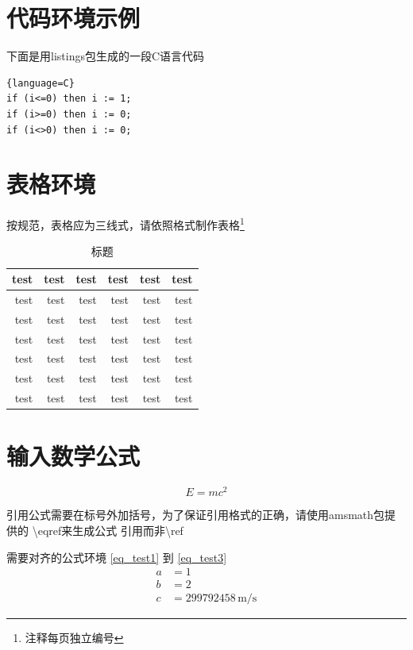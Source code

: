 \section{代码环境示例}

下面是用listings包生成的一段C语言代码
\begin{lstlisting}{language=C}
if (i<=0) then i := 1;
if (i>=0) then i := 0;
if (i<>0) then i := 0;
\end{lstlisting}

\section{表格环境}

按规范，表格应为三线式，请依照格式制作表格\footnote{注释每页独立编号}

\begin{table}[htbp]
  \centering
  \caption{标题}
    \begin{tabular}{rrrrrr}
    \toprule
    test  & test  & test  & test  & test  & test \\
    \midrule
    test  & test  & test  & test  & test  & test \\
    test  & test  & test  & test  & test  & test \\
    test  & test  & test  & test  & test  & test \\
    test  & test  & test  & test  & test  & test \\
    test  & test  & test  & test  & test  & test \\
    test  & test  & test  & test  & test  & test \\
    \bottomrule
    \end{tabular}%
  \label{tab:addlabel}%
\end{table}%

\section{输入数学公式}
\begin{equation}
E=mc^2
\end{equation}

引用公式需要在标号外加括号，为了保证引用格式的正确，请使用amsmath包提供的 \textbackslash eqref来生成公式
引用而非\textbackslash ref

需要对齐的公式环境 \eqref{eq_test1} 到 \eqref{eq_test3}
\begin{align}
a &= 1 \label{eq_test1}\\
b &= 2 \label{eq_test2}\\
c &= 299792458\,\text{m/s} \label{eq_test3}
\end{align}

